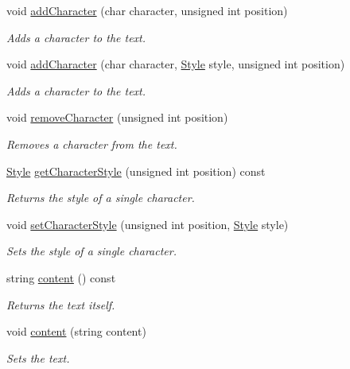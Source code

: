 \begin{CompactItemize}
void \hyperlink{class_text_8e2f98d018b51a0b800bb1189ad7d9ae}{addCharacter} (char character, unsigned int position)
\begin{CompactList}\small\item\em Adds a character to the text. \item\end{CompactList}\item 
void \hyperlink{class_text_a2074d216bde350970d9a4260c2d85bb}{addCharacter} (char character, \hyperlink{class_style}{Style} style, unsigned int position)
\begin{CompactList}\small\item\em Adds a character to the text. \item\end{CompactList}\item 
void \hyperlink{class_text_d62cf2b09042cfd169b8274ef3226fbd}{removeCharacter} (unsigned int position)
\begin{CompactList}\small\item\em Removes a character from the text. \item\end{CompactList}\item 
\hyperlink{class_style}{Style} \hyperlink{class_text_7fec452bd51b06b53fbb5abc9c335459}{getCharacterStyle} (unsigned int position) const 
\begin{CompactList}\small\item\em Returns the style of a single character. \item\end{CompactList}\item 
void \hyperlink{class_text_7cf2efca7fdd4d7b04292e373d5c2e5e}{setCharacterStyle} (unsigned int position, \hyperlink{class_style}{Style} style)
\begin{CompactList}\small\item\em Sets the style of a single character. \item\end{CompactList}\item 
string \hyperlink{class_text_8a29bbf6c707ac8b2055a22723a82f3d}{content} () const 
\begin{CompactList}\small\item\em Returns the text itself. \item\end{CompactList}\item 
void \hyperlink{class_text_7caede09aa76ca7fc26aab3ec3c41181}{content} (string content)
\begin{CompactList}\small\item\em Sets the text. \item\end{CompactList}\item 

\end{CompactItemize}
